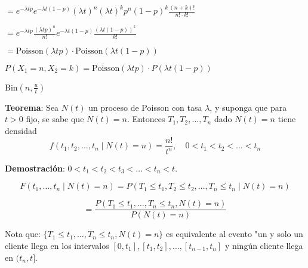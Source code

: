 \documentclass[12pt,a4paper]{article}
\newcommand{\teorema}[1]{%
\begin{teoremabox}
\textbf{Teorema}: #1
\end{teoremabox}
}
\begin{document}
$= e^{-\lambda t p} e^{-\lambda t(1-p)} (\lambda t)^n (\lambda t)^k p^n (1-p)^k \frac{(n+k)!}{n! \cdot k!}$

$= e^{-\lambda t p} \frac{(\lambda t p)^n}{n!} e^{-\lambda t(1-p)} \frac{(\lambda t(1-p))^k}{k!}$

$= \text{Poisson}(\lambda t p) \cdot \text{Poisson}(\lambda t(1-p))$

$P(X_1 = n, X_2 = k) = \text{Poisson}(\lambda t p) \cdot P(\lambda t(1-p))$

\vspace{1cm}

\begin{center}
\end{center}

Bin$(n, \frac{u}{t})$

\teorema{Sea $N(t)$ un proceso de Poisson con tasa $\lambda$, y suponga que para $t > 0$ fijo, se sabe que $N(t) = n$. Entonces $T_1, T_2, \ldots, T_n$ dado $N(t) = n$ tiene densidad
\begin{equation*}
f(t_1, t_2, \ldots, t_n \mid N(t) = n) = \frac{n!}{t^n}, \quad 0 < t_1 < t_2 < \ldots < t_n
\end{equation*}}

\textbf{Demostración}: $0 < t_1 < t_2 < t_3 < \ldots < t_n < t$.

\begin{equation*}
F(t_1, \ldots, t_n \mid N(t) = n) = P(T_1 \leq t_1, T_2 \leq t_2, \ldots, T_n \leq t_n \mid N(t) = n)
\end{equation*}

\begin{equation*}
= \frac{P(T_1 \leq t_1, \ldots, T_n \leq t_n, N(t) = n)}{P(N(t) = n)}
\end{equation*}

Nota que: $\{T_1 \leq t_1, \ldots, T_n \leq t_n, N(t) = n\}$ es equivalente al evento "un y solo un cliente llega en los intervalos $[0, t_1], [t_1, t_2], \ldots, [t_{n-1}, t_n]$ y ningún cliente llega en $(t_n, t]$.
\end{document}
